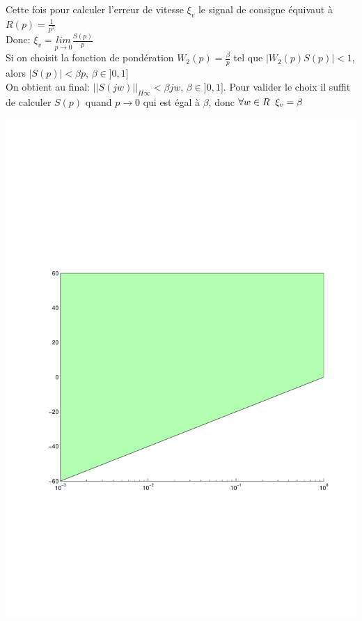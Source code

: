 \documentclass[12pt, a4paper, openany]{report}
\begin{document}
  Cette fois pour calculer l'erreur de vitesse $\xi_{v}$ le signal de consigne équivaut à $R(p)=\frac{1}{p^{2}}$\\[0.75cm]
  Donc: \hspace{5mm} $\xi_{v}=\underset{p\longrightarrow 0}{lim}\frac{S(p)}{p}$\\[0.75cm]
  Si on choisit la fonction de pondération $W_{2}(p)=\frac{\beta}{p}$ tel que $|W_{2}(p)S(p)|<1$, alors $|S(p)|<\beta p$, $\beta \in ]0, 1]$\\[0.75cm]
  On obtient au final: \hspace{5mm} $||S(jw)||_{H\infty}<\beta jw$, $\beta \in ]0, 1]$. Pour valider le choix il suffit de calculer $S(p)$ quand $p\rightarrow0$ qui est égal à $\beta$, donc $\forall w \in R \hspace{2mm} \xi_{v}=\beta$ 
  
  \begin{center}
    \includegraphics[scale=0.5]{gabarit1.pdf}
    \label{fig5}
  \end{center}
  
\end{document}
